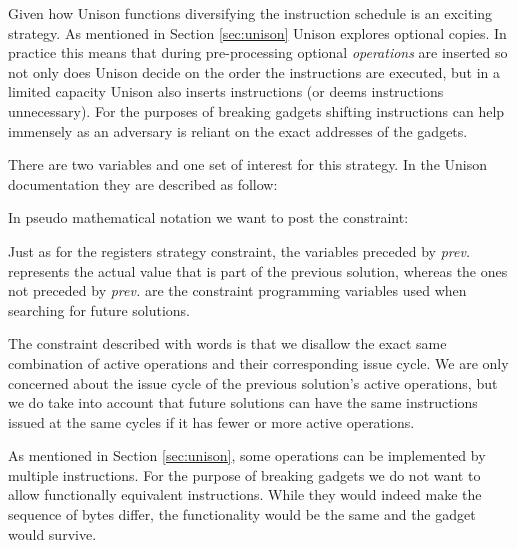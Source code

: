 Given how Unison functions diversifying the instruction schedule is an exciting strategy.
As mentioned in Section \ref{sec:unison} Unison explores optional copies. In practice this
means that during pre-processing optional \textit{operations} are inserted so not only
does Unison decide on the order the instructions are executed, but in a limited capacity
Unison also inserts instructions (or deems instructions unnecessary). For the purposes
of breaking gadgets shifting instructions can help immensely as an adversary is reliant
on the exact addresses of the gadgets.

There are two variables and one set of interest for this strategy. In the Unison
documentation they are described as follow:

\vspace{0.2cm}

\noindent{}

\vspace{0.2cm}

In pseudo mathematical notation we want to post the constraint:

\vspace{0.2cm}
\noindent{}
\vspace{0.2cm}

Just as for the registers strategy constraint, the variables preceded by \textit{prev.}
represents the actual value that is part of the previous solution, whereas the ones not
preceded by \textit{prev.} are the constraint programming variables used when searching for
future solutions.

The constraint described with words is that we disallow the exact same combination of
active operations and their corresponding issue cycle. We are only concerned about the
issue cycle of the previous solution's active operations, but we do take into account that
future solutions can have the same instructions issued at the same cycles if it has fewer
or more active operations.

As mentioned in Section \ref{sec:unison}, some operations can be implemented by multiple
instructions. For the purpose of breaking gadgets we do not want to allow functionally
equivalent instructions. While they would indeed make the sequence of bytes differ, the
functionality would be the same and the gadget would survive.
